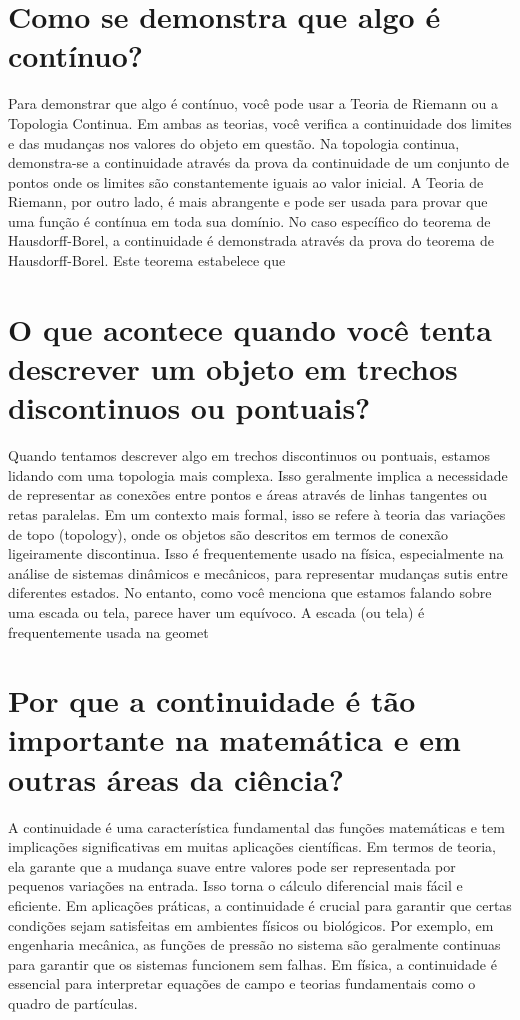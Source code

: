 \documentclass[11pt,a4paper]{article}
\begin{document}
\section{Como se demonstra que algo é contínuo?}
Para demonstrar que algo é contínuo, você pode usar a Teoria de Riemann ou a Topologia Continua. Em ambas as teorias, você verifica a continuidade dos limites e das mudanças nos valores do objeto em questão. Na topologia continua, demonstra-se a continuidade através da prova da continuidade de um conjunto de pontos onde os limites são constantemente iguais ao valor inicial. A Teoria de Riemann, por outro lado, é mais abrangente e pode ser usada para provar que uma função é contínua em toda sua domínio. No caso específico do teorema de Hausdorff-Borel, a continuidade é demonstrada através da prova do teorema de Hausdorff-Borel. Este teorema estabelece que

\section{O que acontece quando você tenta descrever um objeto em trechos discontinuos ou pontuais?}
Quando tentamos descrever algo em trechos discontinuos ou pontuais, estamos lidando com uma topologia mais complexa. Isso geralmente implica a necessidade de representar as conexões entre pontos e áreas através de linhas tangentes ou retas paralelas. Em um contexto mais formal, isso se refere à teoria das variações de topo (topology), onde os objetos são descritos em termos de conexão ligeiramente discontinua. Isso é frequentemente usado na física, especialmente na análise de sistemas dinâmicos e mecânicos, para representar mudanças sutis entre diferentes estados. No entanto, como você menciona que estamos falando sobre uma escada ou tela, parece haver um equívoco. A escada (ou tela) é frequentemente usada na geomet

\section{Por que a continuidade é tão importante na matemática e em outras áreas da ciência?}
A continuidade é uma característica fundamental das funções matemáticas e tem implicações significativas em muitas aplicações científicas. Em termos de teoria, ela garante que a mudança suave entre valores pode ser representada por pequenos variações na entrada. Isso torna o cálculo diferencial mais fácil e eficiente. Em aplicações práticas, a continuidade é crucial para garantir que certas condições sejam satisfeitas em ambientes físicos ou biológicos. Por exemplo, em engenharia mecânica, as funções de pressão no sistema são geralmente continuas para garantir que os sistemas funcionem sem falhas. Em física, a continuidade é essencial para interpretar equações de campo e teorias fundamentais como o quadro de partículas.
\end{document}
